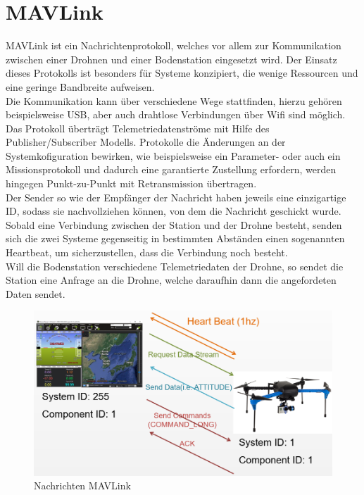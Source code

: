 \section{MAVLink} \label{mavlink}
\ac{MAVLink} ist ein Nachrichtenprotokoll, welches vor allem zur Kommunikation zwischen einer Drohnen und einer Bodenstation eingesetzt wird. Der Einsatz dieses Protokolls ist besonders für Systeme konzipiert, die wenige Ressourcen und eine geringe Bandbreite aufweisen.\\
Die Kommunikation kann über verschiedene Wege stattfinden, hierzu gehören beispielsweise \ac{USB}, aber auch drahtlose Verbindungen über Wifi sind möglich. Das Protokoll überträgt Telemetriedatenströme mit Hilfe des Publisher/Subscriber Modells. Protokolle die Änderungen an der Systemkofiguration bewirken, wie beispielsweise ein Parameter- oder auch ein Missionsprotokoll und dadurch eine garantierte Zustellung erfordern, werden hingegen Punkt-zu-Punkt mit Retransmission übertragen. 
\\
Der Sender so wie der Empfänger der Nachricht haben jeweils eine einzigartige ID, sodass sie nachvollziehen können, von dem die Nachricht geschickt wurde. Sobald eine Verbindung zwischen der Station und der Drohne besteht, senden sich die zwei Systeme gegenseitig in bestimmten Abständen einen sogenannten Heartbeat, um sicherzustellen, dass die Verbindung noch besteht.
\\
Will die Bodenstation verschiedene Telemetriedaten der Drohne, so sendet die Station eine Anfrage an die Drohne, welche daraufhin dann die angefordeten Daten sendet. \cite{mavlink}

\begin{figure}[H]
    \begin{centering}
        \includegraphics[scale=0.4]{images/mavlink-message-flow.png}
        \caption{\label{img mavlink}Nachrichten MAVLink \cite{imgmavlink}}
    \end{centering}
\end{figure}


